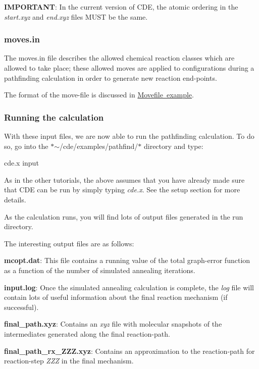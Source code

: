 {\bfseries I\+M\+P\+O\+R\+T\+A\+NT}\+: In the current version of C\+DE, the atomic ordering in the {\itshape start.\+xyz} and {\itshape end.\+xyz} files M\+U\+ST be the same.

\subsubsection*{moves.\+in}

The moves.\+in file describes the allowed chemical reaction classes which are allowed to take place; these allowed moves are applied to configurations during a pathfinding calculation in order to generate new reaction end-\/points.

The format of the move-\/file is discussed in \mbox{\hyperlink{moves}{Movefile example}}.

\subsubsection*{Running the calculation}

With these input files, we are now able to run the pathfinding calculation. To do so, go into the $\ast$$\sim$/cde/examples/pathfind/$\ast$ directory and type\+: \begin{DoxyVerb}cde.x input
\end{DoxyVerb}


As in the other tutorials, the above assumes that you have already made sure that C\+DE can be run by simply typing {\itshape cde.\+x}. See the setup section for more details.

As the calculation runs, you will find lots of output files generated in the run directory.

The interesting output files are as follows\+:


\begin{DoxyItemize}
\item {\bfseries mcopt.\+dat}\+: This file contains a running value of the total graph-\/error function as a function of the number of simulated annealing iterations.
\item {\bfseries input.\+log}\+: Once the simulated annealing calculation is complete, the {\itshape log} file will contain lots of useful information about the final reaction mechanism (if successful).
\item {\bfseries final\+\_\+path.\+xyz}\+: Contains an {\itshape xyz} file with molecular snapshots of the intermediates generated along the final reaction-\/path.
\item {\bfseries final\+\_\+path\+\_\+rx\+\_\+\+Z\+Z\+Z.\+xyz}\+: Contains an approximation to the reaction-\/path for reaction-\/step {\itshape Z\+ZZ} in the final mechanism.
\end{DoxyItemize}

